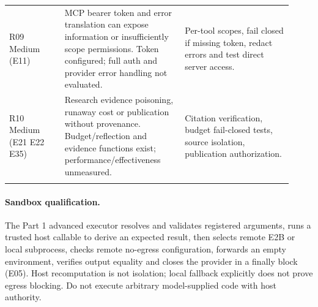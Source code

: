 \documentclass[10pt,letterpaper]{article}
\begin{document}
\begin{longtable}{@{}>{\raggedright\arraybackslash}p{0.18\linewidth}>{\raggedright\arraybackslash}p{0.39\linewidth}>{\raggedright\arraybackslash}p{0.35\linewidth}@{}}
R09 Medium (E11) & MCP bearer token and error translation can expose information or insufficiently scope permissions. Token configured; full auth and provider error handling not evaluated. & Per-tool scopes, fail closed if missing token, redact errors and test direct server access.\\\addlinespace
R10 Medium (E21 E22 E35) & Research evidence poisoning, runaway cost or publication without provenance. Budget/reflection and evidence functions exist; performance/effectiveness unmeasured. & Citation verification, budget fail-closed tests, source isolation, publication authorization.\\\addlinespace
\bottomrule\end{longtable}
\paragraph{Sandbox qualification.} The Part 1 advanced executor resolves and validates registered arguments, runs a trusted host callable to derive an expected result, then selects remote E2B or local subprocess, checks remote no-egress configuration, forwards an empty environment, verifies output equality and closes the provider in a finally block (E05). Host recomputation is not isolation; local fallback explicitly does not prove egress blocking. Do not execute arbitrary model-supplied code with host authority.
\end{document}
